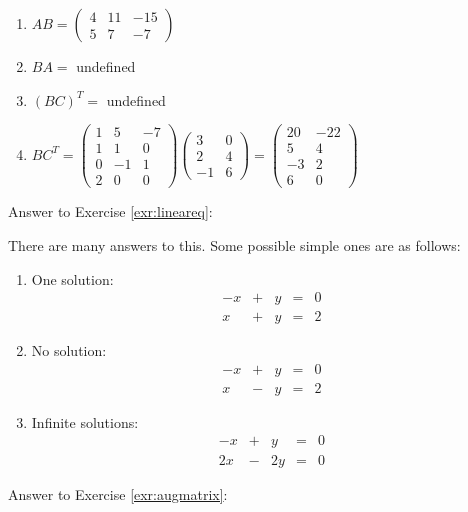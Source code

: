 \documentclass[
]{book}
\theoremstyle{definition}
\theoremstyle{definition}
\theoremstyle{definition}
\theoremstyle{definition}
\theoremstyle{remark}
\begin{document}
\begin{enumerate}
\def\labelenumi{\arabic{enumi}.}
\item
  \(AB = \begin{pmatrix} 4 & 11 & -15 \\ 5 & 7 & -7 \end{pmatrix}\)
\item
  \(BA =\) undefined
\item
  \((BC)^T =\) undefined
\item
  \(BC^T = \begin{pmatrix} 1&5&-7\\1&1&0\\0&-1&1\\2&0&0\end{pmatrix}\begin{pmatrix} 3&0\\2&4\\-1&6 \end{pmatrix} =\begin{pmatrix}20 & -22 \\ 5 & 4 \\ -3 &2 \\6 & 0\end{pmatrix}\)
\end{enumerate}

Answer to Exercise \ref{exr:lineareq}:

There are many answers to this. Some possible simple ones are as follows:

\begin{enumerate}
\def\labelenumi{\arabic{enumi}.}
\item
  One solution: \[\begin{matrix}
           -x  & + & y & = & 0\\
           x & + &  y & = &  2
           \end{matrix}\]
\item
  No solution: \[\begin{matrix}
          -x  & + & y & = & 0\\
          x & - &  y & = &  2
          \end{matrix}\]
\item
  Infinite solutions: \[\begin{matrix}
           -x  & + & y & = & 0\\
           2x & - &  2y & = &  0
           \end{matrix}\]
\end{enumerate}

Answer to Exercise \ref{exr:augmatrix}:
\end{document}
